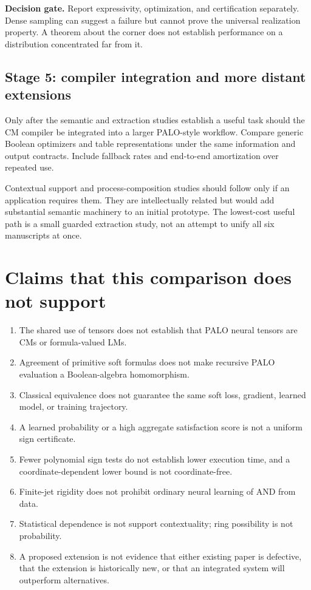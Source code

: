 \documentclass[11pt,a4paper]{article}
\theoremstyle{remark}
\begin{document}
\textbf{Decision gate.} Report expressivity, optimization, and certification separately. Dense sampling can suggest a failure but cannot prove the universal realization property. A theorem about the corner does not establish performance on a distribution concentrated far from it.

\subsection{Stage 5: compiler integration and more distant extensions}
Only after the semantic and extraction studies establish a useful task should the CM compiler be integrated into a larger PALO-style workflow. Compare generic Boolean optimizers and table representations under the same information and output contracts. Include fallback rates and end-to-end amortization over repeated use.

Contextual support and process-composition studies should follow only if an application requires them. They are intellectually related but would add substantial semantic machinery to an initial prototype. The lowest-cost useful path is a small guarded extraction study, not an attempt to unify all six manuscripts at once.

\section{Claims that this comparison does not support}
\begin{enumerate}
\item The shared use of tensors does not establish that PALO neural tensors are CMs or formula-valued LMs.
\item Agreement of primitive soft formulas does not make recursive PALO evaluation a Boolean-algebra homomorphism.
\item Classical equivalence does not guarantee the same soft loss, gradient, learned model, or training trajectory.
\item A learned probability or a high aggregate satisfaction score is not a uniform sign certificate.
\item Fewer polynomial sign tests do not establish lower execution time, and a coordinate-dependent lower bound is not coordinate-free.
\item Finite-jet rigidity does not prohibit ordinary neural learning of AND from data.
\item Statistical dependence is not support contextuality; ring possibility is not probability.
\item A proposed extension is not evidence that either existing paper is defective, that the extension is historically new, or that an integrated system will outperform alternatives.
\end{enumerate}
\end{document}
